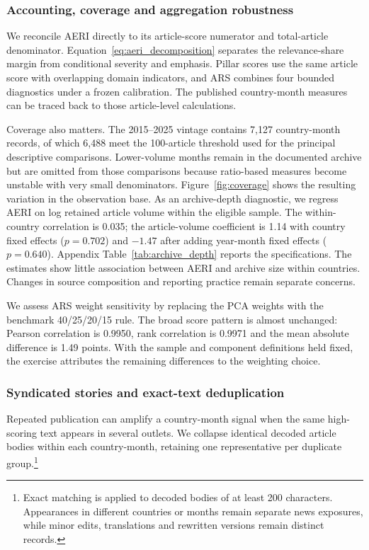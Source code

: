 \documentclass[12pt]{article}
\begin{document}
\subsubsection{Accounting, coverage and aggregation robustness}
We reconcile AERI directly to its article-score numerator and total-article denominator. Equation~\eqref{eq:aeri_decomposition} separates the relevance-share margin from conditional severity and emphasis. Pillar scores use the same article score with overlapping domain indicators, and ARS combines four bounded diagnostics under a frozen calibration. The published country-month measures can be traced back to those article-level calculations.

Coverage also matters. The 2015--2025 vintage contains 7,127 country-month records, of which 6,488 meet the 100-article threshold used for the principal descriptive comparisons. Lower-volume months remain in the documented archive but are omitted from those comparisons because ratio-based measures become unstable with very small denominators. Figure~\ref{fig:coverage} shows the resulting variation in the observation base. As an archive-depth diagnostic, we regress AERI on log retained article volume within the eligible sample. The within-country correlation is 0.035; the article-volume coefficient is 1.14 with country fixed effects ($p=0.702$) and $-1.47$ after adding year-month fixed effects ($p=0.640$). Appendix Table~\ref{tab:archive_depth} reports the specifications. The estimates show little association between AERI and archive size within countries. Changes in source composition and reporting practice remain separate concerns.

We assess ARS weight sensitivity by replacing the PCA weights with the benchmark 40/25/20/15 rule. The broad score pattern is almost unchanged: Pearson correlation is 0.9950, rank correlation is 0.9971 and the mean absolute difference is 1.49 points. With the sample and component definitions held fixed, the exercise attributes the remaining differences to the weighting choice.

\subsubsection{Syndicated stories and exact-text deduplication}\label{sec:deduplication}
Repeated publication can amplify a country-month signal when the same high-scoring text appears in several outlets. We collapse identical decoded article bodies within each country-month, retaining one representative per duplicate group.\footnote{Exact matching is applied to decoded bodies of at least 200 characters. Appearances in different countries or months remain separate news exposures, while minor edits, translations and rewritten versions remain distinct records.}
\end{document}
